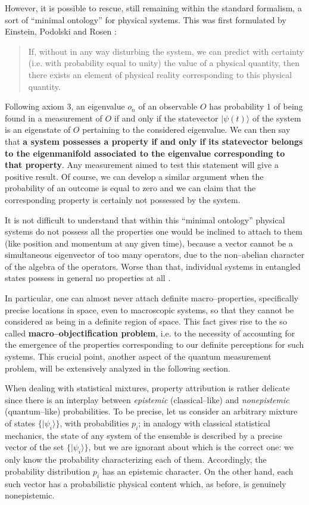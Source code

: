 \documentclass[12pt]{article}
\begin{document}
However, it is possible to rescue, still remaining within the
standard formalism, a sort of ``minimal ontology'' for physical
systems. This was first formulated  by Einstein, Podolski and
Rosen \cite{epr}:
\begin{quotation}
If, without in any way disturbing the system, we can predict with
certainty (i.e. with probability equal to unity) the value of a
physical quantity, then there exists an element of physical
reality corresponding to this physical quantity.
\end{quotation}
Following axiom 3, an eigenvalue $o_{n}$ of an observable $O$ has
probability $1$ of being found in a measurement of $O$ if and only
if the statevector $|\psi(t)\rangle$ of the system is an
eigenstate of $O$ pertaining to the considered eigenvalue. We can
then say that {\bf a system possesses a property if and only if
its statevector belongs to the eigenmanifold associated to the
eigenvalue corresponding to that property}. Any measurement aimed
to test this statement will give a positive result. Of course, we
can develop a similar argument when the probability of an outcome
is equal to zero and we can claim that the corresponding property is
certainly not possessed by the system.

It is not difficult to understand that within this ``minimal
ontology'' physical systems do not possess all the properties one
would be inclined to attach to them (like position and momentum at
any given time), because a vector cannot be a simultaneous
eigenvector of too many operators, due to the non--abelian
character of the algebra of the operators. Worse than that,
individual systems in entangled states possess in general no
properties at all \cite{gm}.

In particular, one can almost never attach definite
macro--properties, specifically precise locations in space, even
to macroscopic systems, so that they cannot be considered as being
in a definite region of space. This fact gives rise to the so
called {\bf macro--objectification problem}, i.e. to the necessity
of accounting for the emergence of the properties corresponding to
our definite perceptions for such systems. This crucial point,
another aspect of the quantum measurement problem, will be
extensively analyzed in the following section.

When dealing with statistical mixtures, property attribution is
rather delicate since there is an interplay between {\it
epistemic} (classical--like) and {\it nonepistemic}
(quantum--like) probabilities. To be precise, let us consider an
arbitrary mixture of states $\{|\psi_{i}\rangle\}$, with
probabilities $p_{i}$; in analogy with classical statistical
mechanics, the state of any system of the ensemble is described by
a precise vector of the set $\{|\psi_{i}\rangle\}$, but we are
ignorant about which is the correct one: we only know the
probability characterizing each of them. Accordingly, the
probability distribution $p_{i}$ has an epistemic character. On
the other hand, each such vector has a probabilistic physical
content which, as before, is genuinely nonepistemic.
\end{document}
